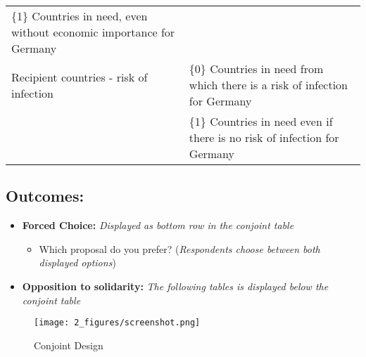 \documentclass[12pt,oneside,smallheadings,chapterprefix=true]{article}
\begin{document}
\begin{longtable}[]{@{}ll@{}}
\begin{minipage}[t]{0.54\columnwidth}
\{1\} Countries in need, even without economic importance for
Germany\strut
\end{minipage}\tabularnewline
\begin{minipage}[t]{0.40\columnwidth}\raggedright
Recipient countries - risk of infection\strut
\end{minipage} & \begin{minipage}[t]{0.54\columnwidth}\raggedright
\{0\} Countries in need from which there is a risk of infection for
Germany\strut
\end{minipage}\tabularnewline
\begin{minipage}[t]{0.40\columnwidth}\raggedright
\strut
\end{minipage} & \begin{minipage}[t]{0.54\columnwidth}\raggedright
\{1\} Countries in need even if there is no risk of infection for
Germany\strut
\end{minipage}\tabularnewline
\bottomrule
\end{longtable}

\hypertarget{outcomes}{%
\subsection{Outcomes:}\label{outcomes}}

\begin{itemize}
\tightlist
\item
  \textbf{Forced Choice:} \emph{Displayed as bottom row in the conjoint
  table}

  \begin{itemize}
  \tightlist
  \item
    Which proposal do you prefer? (\emph{Respondents choose between both
    displayed options})
  \end{itemize}
\end{itemize}

\begin{itemize}
\tightlist
\item
  \textbf{Opposition to solidarity:} \emph{The following tables is
  displayed below the conjoint table}
\end{itemize}



\begin{figure}[hbt!]
\texttt{[image: 2\_figures/screenshot.png]}
\caption{Conjoint Design}
\label{fig:conjoint}

\end{figure}
\end{document}

